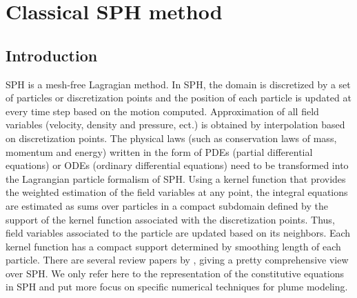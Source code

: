 \chapter{Classical SPH method}

\section{Introduction}
SPH is a mesh-free Lagragian method. In SPH, the domain is discretized by a set of particles or discretization points and the position of each particle is updated at every time step based on the motion computed. Approximation of all field variables (velocity, density and pressure, ect.) is obtained by interpolation based on discretization points. The physical laws (such as conservation laws of mass, momentum and energy) written in the form of PDEs (partial differential equations)  or ODEs (ordinary differential equations) need to be transformed into the Lagrangian particle formalism of SPH. Using a kernel function that provides the weighted estimation of the field variables at any point, the integral equations are estimated as sums over particles in a compact subdomain defined by the support of the kernel function associated with the discretization points. Thus, field variables associated to the particle are updated based on its neighbors. Each kernel function has a compact support determined by smoothing length of each particle. There are several review papers by \citet{monaghan1992smoothed, monaghan2005smoothed, rosswog2009astrophysical, price2012smoothed, monaghan2012smoothed}, giving a pretty comprehensive view over SPH. We only refer here to the representation of the constitutive equations in SPH and put more focus on specific numerical techniques for plume modeling.

